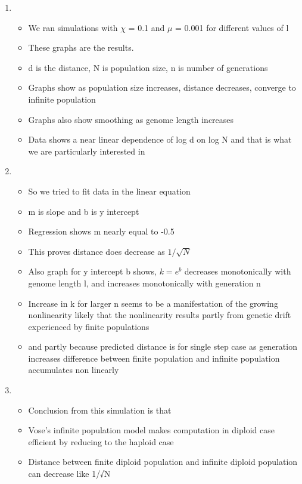 \documentclass{article}
\begin{document}
\begin{enumerate}
\item
  \begin{itemize}
  \item We ran simulations with $\chi$ = 0.1 and $\mu$ = 0.001 for
    different values of l
  \item These graphs are the results.
  \item d is the distance, N is population size, n is number of
    generations
  \item Graphs show as population size increases, distance decreases,
    converge to infinite population
  \item Graphs also show smoothing as genome length increases
  \item Data shows a near linear dependence of log d on log N and that
    is what we are particularly interested in
  \end{itemize}
    
\item
  \begin{itemize}
  \item So we tried to fit data in the linear equation
  \item m is slope and b is y intercept
  \item Regression shows m nearly equal to -0.5
  \item This proves distance does decrease as $1/\sqrt{N}$
  \item Also graph for y intercept b shows, $k = e^b$ decreases
    monotonically with genome length l, and increases monotonically
    with generation n
  \item Increase in k for larger n seems to be a manifestation of the
    growing nonlinearity likely that the nonlinearity results partly
    from genetic drift experienced by finite populations
  \item and partly because predicted distance is for single step case
    as generation increases difference between finite population and
    infinite population accumulates non linearly
  \end{itemize}

\item
  \begin{itemize}
  \item Conclusion from this simulation is that
  \item Vose's infinite population model makes computation in diploid
     case efficient by reducing to the haploid case
  \item Distance between finite diploid population and infinite
    diploid population can decrease like 1/√N
  \end{itemize}


\end{enumerate}
\end{document}
